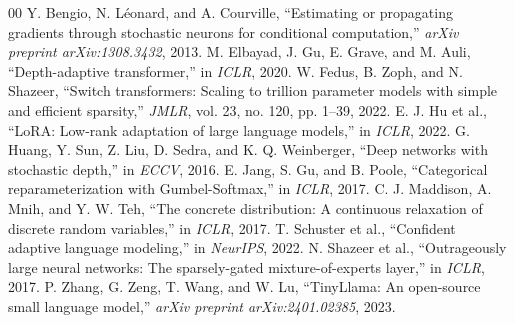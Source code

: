 \documentclass[conference]{IEEEtran}
\begin{document}
\begin{thebibliography}{00}
 Y. Bengio, N. Léonard, and A. Courville, ``Estimating or propagating gradients through stochastic neurons for conditional computation,'' \textit{arXiv preprint arXiv:1308.3432}, 2013.
 M. Elbayad, J. Gu, E. Grave, and M. Auli, ``Depth-adaptive transformer,'' in \textit{ICLR}, 2020.
 W. Fedus, B. Zoph, and N. Shazeer, ``Switch transformers: Scaling to trillion parameter models with simple and efficient sparsity,'' \textit{JMLR}, vol. 23, no. 120, pp. 1--39, 2022.
 E. J. Hu et al., ``LoRA: Low-rank adaptation of large language models,'' in \textit{ICLR}, 2022.
 G. Huang, Y. Sun, Z. Liu, D. Sedra, and K. Q. Weinberger, ``Deep networks with stochastic depth,'' in \textit{ECCV}, 2016.
 E. Jang, S. Gu, and B. Poole, ``Categorical reparameterization with Gumbel-Softmax,'' in \textit{ICLR}, 2017.
 C. J. Maddison, A. Mnih, and Y. W. Teh, ``The concrete distribution: A continuous relaxation of discrete random variables,'' in \textit{ICLR}, 2017.
 T. Schuster et al., ``Confident adaptive language modeling,'' in \textit{NeurIPS}, 2022.
 N. Shazeer et al., ``Outrageously large neural networks: The sparsely-gated mixture-of-experts layer,'' in \textit{ICLR}, 2017.
 P. Zhang, G. Zeng, T. Wang, and W. Lu, ``TinyLlama: An open-source small language model,'' \textit{arXiv preprint arXiv:2401.02385}, 2023.
\end{thebibliography}
\end{document}
